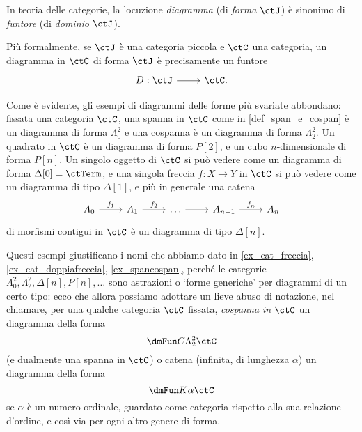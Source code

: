 \begin{example}
\end{example}
\begin{example}
\end{example}
\begin{example}
\end{example}
\begin{definition}\label{def_diagramma_comm}
	In teoria delle categorie, la locuzione \emph{diagramma} (di \emph{forma} \(\ctJ\)) è sinonimo di \emph{funtore} (di \emph{dominio} \(\ctJ\)).

	Più formalmente, se \(\ctJ\) è una categoria piccola e \(\ctC\) una categoria, un diagramma in \(\ctC\) di forma \(\ctJ\) è precisamente un funtore
	\[\begin{tikzcd}
			D : \ctJ \ar[r] & \ctC.
		\end{tikzcd}
	\]
\end{definition}
\begin{remark}
	Come è evidente, gli esempi di diagrammi delle forme più svariate abbondano: fissata una categoria \(\ctC\), una spanna in \(\ctC\) come in \ref{def_span_e_cospan} è un diagramma di forma \(\Lambda^2_0\) e una cospanna è un diagramma di forma \(\Lambda^2_2\). Un quadrato in \(\ctC\) è un diagramma di forma \(P[2]\), e un cubo \(n\)-dimensionale di forma \(P[n]\). Un singolo oggetto di \(\ctC\) si può vedere come un diagramma di forma \(\Delta[0]=\ctTerm\), e una singola freccia \(f : X\to Y\) in \(\ctC\) si può vedere come un diagramma di tipo \(\Delta[1]\), e più in generale una catena
	\[\begin{tikzcd}
			A_0 \ar[r, "f_1"] & A_1 \ar[r, "f_2"] & \dots \ar[r] & A_{n-1} \ar[r, "f_n"] & A_n
		\end{tikzcd}
	\]
	di morfismi contigui in \(\ctC\) è un diagramma di tipo \(\Delta[n]\).

	Questi esempi giustificano i nomi che abbiamo dato in \ref{ex_cat_freccia}, \ref{ex_cat_doppiafreccia}, \ref{ex_spancospan}, perché le categorie \(\Lambda^2_0,\Lambda^2_2,\Delta[n], P[n], \dots\)  sono astrazioni o `forme generiche' per diagrammi di un certo tipo: ecco che allora possiamo adottare un lieve abuso di notazione, nel chiamare, per una qualche categoria $\ctC$ fissata, \emph{cospanna in $\ctC$} un diagramma della forma
	\[\dmFun C{\Lambda^2_2}\ctC\]
	(e dualmente una spanna in $\ctC$) o catena (infinita, di lunghezza $\alpha$) un diagramma della forma
	\[\dmFun K\alpha\ctC\]
	se $\alpha$ è un numero ordinale, guardato come categoria rispetto alla sua relazione d'ordine, e così via per ogni altro genere di forma.
\end{remark}
